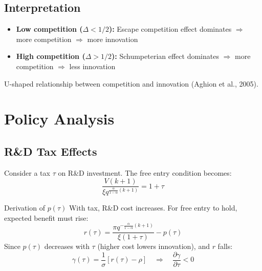 \documentclass[a4paper,11pt]{article}
\begin{document}

\subsection*{Interpretation}
\begin{itemize}
    \item \textbf{Low competition ($\Delta < 1/2$):} Escape competition effect dominates $\Rightarrow$ more competition $\Rightarrow$ more innovation
    \item \textbf{High competition ($\Delta > 1/2$):} Schumpeterian effect dominates $\Rightarrow$ more competition $\Rightarrow$ less innovation
\end{itemize}

\begin{tcolorbox}[colback=purple!10,colframe=purple,title=Empirical Prediction]
U-shaped relationship between competition and innovation (Aghion et al., 2005).
\end{tcolorbox}

\clearpage

\section{Policy Analysis}

\subsection*{R\&D Tax Effects}
Consider a tax $\tau$ on R\&D investment. The free entry condition becomes:
\[
\frac{V(k+1)}{\xi q^{\frac{\alpha}{1-\alpha}(k+1)}} = 1 + \tau
\]

\begin{derivationbox}{Derivation of $p(\tau)$}
With tax, R\&D cost increases. For free entry to hold, expected benefit must rise:
\[
r(\tau) = \frac{\pi q^{-\frac{\alpha}{1-\alpha}(k+1)}}{\xi(1+\tau)} - p(\tau)
\]
Since $p(\tau)$ decreases with $\tau$ (higher cost lowers innovation), and $r$ falls:
\[
\gamma(\tau) = \frac{1}{\sigma}[r(\tau) - \rho] \quad \Rightarrow \quad \frac{\partial\gamma}{\partial\tau} < 0
\]
\end{derivationbox}
\end{document}
